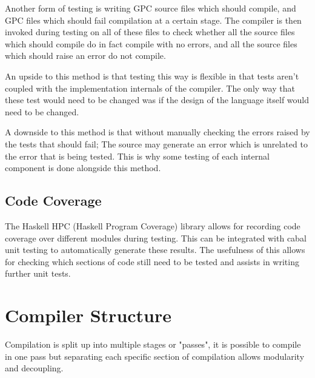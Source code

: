 Another form of testing is writing GPC source files which should compile, and
GPC files which should fail compilation at a certain stage. The compiler
is then invoked during testing on all of these files to check whether
all the source files which should compile do in fact compile with no errors,
and all the source files which should raise an error do not compile.

An upside to this method is that testing this way is flexible in that
tests aren't coupled with the implementation internals of the compiler.
The only way that these test would need to be changed was if the design
of the language itself would need to be changed.

A downside to this method is that without manually checking the errors raised
by the tests that should fail; The source may generate an error which is unrelated
to the error that is being tested. This is why some testing of each internal
component is done alongside this method.

\subsection{Code Coverage}

The Haskell HPC\cite{hpc} (Haskell Program Coverage) library allows for recording
code coverage over different modules during testing. This can be integrated with
cabal unit testing to automatically generate these results. The usefulness of this
allows for checking which sections of code still need to be tested and assists
in writing further unit tests.


\section{Compiler Structure}
Compilation is split up into multiple stages or "passes",
it is possible to compile in one pass but separating each 
specific section of compilation allows modularity and decoupling.

